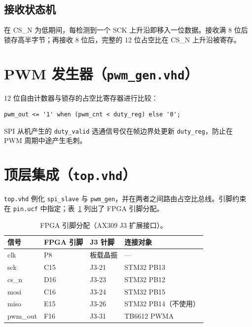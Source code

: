 \documentclass[12pt, a4paper]{ctexrep}
\begin{document}
\subsection{接收状态机}

在 CS\_N 为低期间，每检测到一个 SCK 上升沿即移入一位数据。接收满 8 位后锁存高半字节；再接收 8 位后，完整的 12 位占空比在 CS\_N 上升沿被寄存。

\section{PWM 发生器（\texttt{pwm\_gen.vhd}）}

12 位自由计数器与锁存的占空比寄存器进行比较：

\begin{lstlisting}[style=vhdlstyle, caption={PWM 比较器。}]
pwm_out <= '1' when (pwm_cnt < duty_reg) else '0';
\end{lstlisting}

SPI 从机产生的 \texttt{duty\_valid} 选通信号仅在帧边界处更新 \texttt{duty\_reg}，防止在 PWM 周期中途产生毛刺。

\section{顶层集成（\texttt{top.vhd}）}

\texttt{top.vhd} 例化 \texttt{spi\_slave} 与 \texttt{pwm\_gen}，并在两者之间路由占空比总线。引脚约束在 \texttt{pin.ucf} 中指定；表~\ref{tab:fpga_pins} 列出了 FPGA 引脚分配。

\begin{table}[H]
    \centering
    \caption{FPGA 引脚分配（AX309 J3 扩展接口）。}
    \label{tab:fpga_pins}
    \begin{tabular}{llll}
        \toprule
        \textbf{信号} & \textbf{FPGA 引脚} & \textbf{J3 针脚} & \textbf{连接对象} \\
        \midrule
        clk      & P8  & 板载晶振 & --- \\
        sck      & C15 & J3-21 & STM32 PB13 \\
        cs\_n    & D16 & J3-23 & STM32 PB12 \\
        mosi     & C16 & J3-24 & STM32 PB15 \\
        miso     & E15 & J3-26 & STM32 PB14（不使用） \\
        pwm\_out & F16 & J3-31 & TB6612 PWMA \\
        \bottomrule
    \end{tabular}
\end{table}
\end{document}
